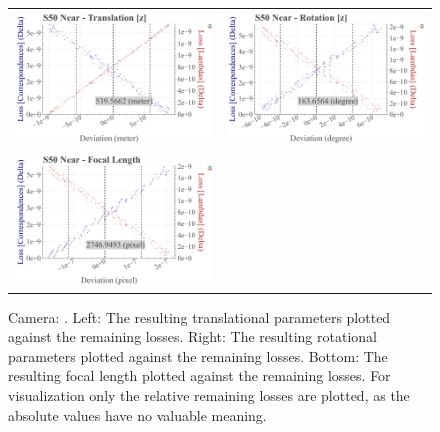 \begin{figure}[!ht]
\begin{tabular}{cc}
    \includegraphics[width=0.45 \linewidth]{diagrams/calibration/s50_s_near/parameters.csv/Translation[z]_vs_Loss[Correspondences]_vs_Loss[Lambdas]_cluster_All.png} &
    \includegraphics[width=0.45 \linewidth]{diagrams/calibration/s50_s_near/parameters.csv/Rotation[z]_vs_Loss[Correspondences]_vs_Loss[Lambdas]_cluster_All.png} \\

    \includegraphics[width=0.45 \linewidth]{diagrams/calibration/s50_s_near/parameters.csv/FocalLength_vs_Loss[Correspondences]_vs_Loss[Lambdas]_cluster_All.png} &
\end{tabular}
\caption{
  Camera: .
  Left: The resulting translational parameters plotted against the remaining losses. 
  Right: The resulting rotational parameters plotted against the remaining losses.
  Bottom: The resulting focal length  plotted against the remaining losses.
  For visualization only the relative remaining losses are plotted, as the absolute values have no valuable meaning.
     }
\label{fig:static_calibration_algorithmic_error_s50_s_near}
\end{figure}
